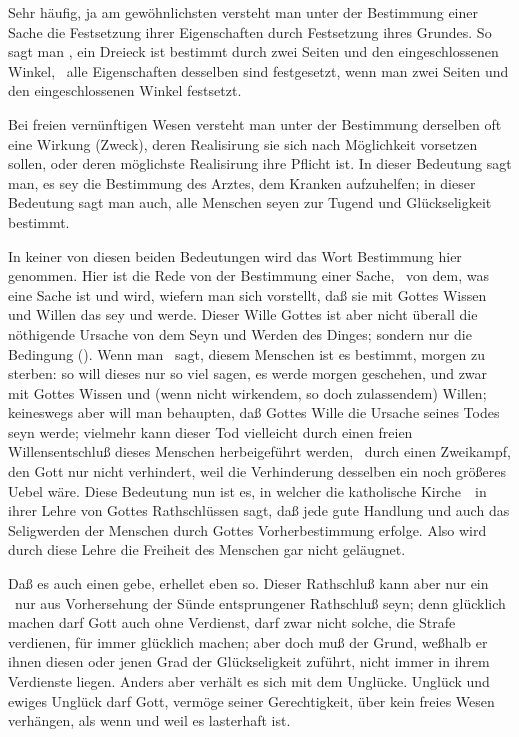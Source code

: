 \begin{aufzb}[1.]
\item Sehr häufig, ja am gewöhnlichsten versteht man unter der Bestimmung einer Sache die Festsetzung ihrer Eigenschaften durch Festsetzung ihres Grundes. So sagt man \zB , ein Dreieck ist bestimmt durch zwei Seiten und den eingeschlossenen Winkel, \dh\ alle Eigenschaften desselben sind festgesetzt, wenn man zwei Seiten und den eingeschlossenen Winkel festsetzt.
\item Bei freien vernünftigen Wesen versteht man unter der Bestimmung derselben oft eine Wirkung (Zweck), deren Realisirung sie sich nach Möglichkeit vorsetzen sollen, oder deren möglichste Realisirung ihre Pflicht ist. In dieser Bedeutung sagt man, es sey die Bestimmung des Arztes, dem Kranken aufzuhelfen; in dieser Bedeutung sagt man auch, alle Menschen seyen zur Tugend und Glückseligkeit bestimmt.
\item In keiner von diesen beiden Bedeutungen wird das Wort Bestimmung hier genommen. Hier ist die Rede von der  Bestimmung einer Sache, \dh\ von dem, was eine Sache ist und wird, wiefern man sich vorstellt, daß sie mit Gottes Wissen und Willen das sey und werde. Dieser Wille Gottes ist aber nicht überall die nöthigende Ursache von dem Seyn und Werden des Dinges; sondern nur die Bedingung (). Wenn man \zB\ sagt, diesem Menschen ist es bestimmt, morgen zu sterben: so will dieses nur so viel sagen, es werde morgen geschehen, und zwar mit Gottes Wissen und (wenn nicht wirkendem, so doch zulassendem) Willen; keineswegs aber will man behaupten, daß Gottes Wille die  Ursache seines Todes seyn werde; vielmehr kann dieser Tod vielleicht durch einen freien Willensentschluß dieses Menschen herbeigeführt werden, \zB\ durch einen Zweikampf, den Gott nur nicht verhindert, weil die Verhinderung desselben ein noch größeres Uebel wäre. Diese Bedeutung nun ist es, in welcher die katholische Kirche~\ in ihrer Lehre von Gottes Rathschlüssen sagt, daß jede gute Handlung und auch das Seligwerden der Menschen durch Gottes Vorherbestimmung erfolge. Also wird durch diese Lehre die Freiheit des Menschen gar nicht geläugnet.
\end{aufzb}
\begin{aufza}[7.]
\item Daß es auch einen  gebe, erhellet eben so. Dieser Rathschluß kann aber nur ein  \dh\ nur aus Vorhersehung der Sünde entsprungener Rathschluß seyn; denn glücklich machen darf Gott auch ohne Verdienst, darf zwar nicht solche, die Strafe verdienen, für immer glücklich machen; aber doch muß der Grund, weßhalb er ihnen diesen oder jenen Grad der Glückseligkeit zuführt, nicht immer in ihrem Verdienste liegen. Anders aber verhält es sich mit dem Unglücke. Unglück und ewiges Unglück darf Gott, vermöge seiner Gerechtigkeit, über kein freies Wesen verhängen, als wenn und weil es lasterhaft ist.
\end{aufza}\par
